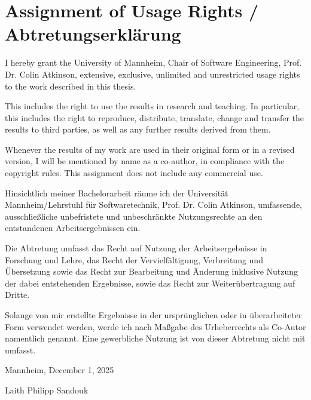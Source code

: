 \chapter*{\large Assignment of Usage Rights / Abtretungserkl\"arung}
\pagestyle{empty}
I hereby grant the University of Mannheim, Chair of Software Engineering, Prof. Dr. Colin Atkinson, extensive, exclusive, unlimited and unrestricted usage rights to the work described in this thesis. 

This includes the right to use the results in research and teaching. In particular, this includes the right to reproduce, distribute, translate, change and transfer the results to third parties, as well as any further results derived from them.

Whenever the results of my work are used in their original form or in a revised version, I will be mentioned by name as a co-author, in compliance with the copyright rules. This assignment does not include any commercial use.

\vspace{-0.3cm}

\hrulefill

\vspace{-0.2cm} 
Hinsichtlich meiner Bachelorarbeit räume ich der Universität Mannheim/Lehrstuhl für Softwaretechnik,
Prof. Dr. Colin Atkinson, umfassende, ausschließliche unbefristete und
unbeschränkte Nutzungsrechte an den entstandenen Arbeitsergebnissen ein.

Die Abtretung umfasst das Recht auf Nutzung der Arbeitsergebnisse in Forschung
und Lehre, das Recht der Vervielfältigung, Verbreitung und Übersetzung sowie
das Recht zur Bearbeitung und Änderung inklusive Nutzung der dabei
entstehenden Ergebnisse, sowie das Recht zur Weiterübertragung auf Dritte.

Solange von mir erstellte Ergebnisse in der ursprünglichen oder in
überarbeiteter Form verwendet werden, werde ich nach Maßgabe des Urheberrechts
als Co-Autor namentlich genannt. Eine gewerbliche Nutzung ist von dieser
Abtretung nicht mit umfasst.
\bigskip

\vspace{1.0cm}

Mannheim, December 1, 2025

\vspace{1.5cm}

Laith Philipp Sandouk
